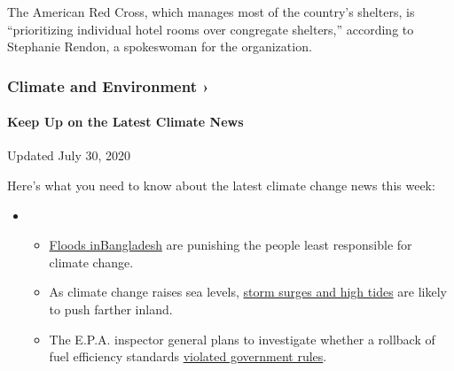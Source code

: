 The American Red Cross, which manages most of the country's shelters, is
``prioritizing individual hotel rooms over congregate shelters,''
according to Stephanie Rendon, a spokeswoman for the organization.

\href{https://www.nytimes.com/section/climate?action=click\&pgtype=Article\&state=default\&region=MAIN_CONTENT_1\&context=storylines_keepup}{}

\hypertarget{climate-and-environment-}{%
\subsubsection{Climate and Environment
›}\label{climate-and-environment-}}

\hypertarget{keep-up-on-the-latest-climate-news}{%
\paragraph{Keep Up on the Latest Climate
News}\label{keep-up-on-the-latest-climate-news}}

Updated July 30, 2020

Here's what you need to know about the latest climate change news this
week:

\begin{itemize}
\item
  \begin{itemize}
  \tightlist
  \item
    \href{https://www.nytimes.com/2020/07/30/climate/bangladesh-floods.html?action=click\&pgtype=Article\&state=default\&region=MAIN_CONTENT_1\&context=storylines_keepup}{Floods
    in}\href{https://www.nytimes.com/2020/07/30/climate/bangladesh-floods.html?action=click\&pgtype=Article\&state=default\&region=MAIN_CONTENT_1\&context=storylines_keepup}{Bangladesh}
    are punishing the people least responsible for climate change.
  \item
    As climate change raises sea levels,
    \href{https://www.nytimes.com/2020/07/30/climate/sea-level-inland-floods.html?action=click\&pgtype=Article\&state=default\&region=MAIN_CONTENT_1\&context=storylines_keepup}{storm
    surges and high tides} are likely to push farther inland.
  \item
    The E.P.A. inspector general plans to investigate whether a rollback
    of fuel efficiency standards
    \href{https://www.nytimes.com/2020/07/27/climate/trump-fuel-efficiency-rule.html?action=click\&pgtype=Article\&state=default\&region=MAIN_CONTENT_1\&context=storylines_keepup}{violated
    government rules}.
  \end{itemize}
\end{itemize}

